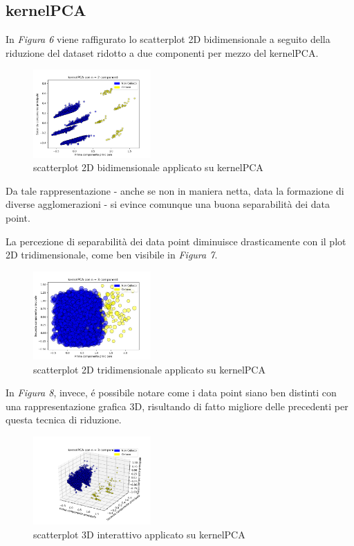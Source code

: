 \documentclass[11pt,a4paper,twocolumn]{article}
\begin{document}
\subsection{kernelPCA}
In \emph{Figura 6} viene raffigurato lo scatterplot 2D bidimensionale a seguito della riduzione del dataset ridotto a due componenti per mezzo del kernelPCA.

	\begin{figure}[h]
		\centering
		\includegraphics[width=0.4\textwidth]{img/kernelPCA_2Dnc2.png}
		\caption{scatterplot 2D bidimensionale applicato su kernelPCA}
	\end{figure}

	Da tale rappresentazione - anche se non in maniera netta, data la formazione di diverse agglomerazioni - si evince comunque una buona separabilità dei data point.  \par 
La percezione di separabilità dei data point diminuisce drasticamente con il plot 2D tridimensionale, come ben visibile in \emph{Figura 7}. \newpage

	\begin{figure}[H]
		\centering
		\includegraphics[width=0.4\textwidth]{img/kernelPCA_2Dnc3.png}
		\caption{scatterplot 2D tridimensionale applicato su kernelPCA}
	\end{figure}

In \emph{Figura 8}, invece, é possibile notare come i data point siano ben distinti con una rappresentazione grafica 3D, risultando di fatto migliore delle precedenti per questa tecnica di riduzione.

	\begin{figure}[H]
		\centering
		\includegraphics[width=0.4\textwidth]{img/kernelPCA_i3D.png}
		\caption{scatterplot 3D interattivo applicato su kernelPCA}
	\end{figure}
\end{document}
